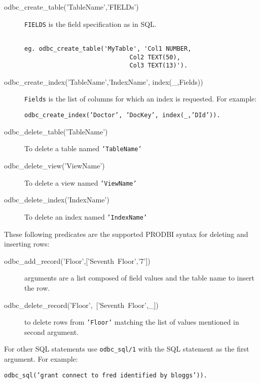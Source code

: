 \begin{description}

\item[odbc\_create\_table('TableName','FIELDs')]
	{\tt FIELDS} is the field specification as in SQL.
\begin{verbatim}

eg. odbc_create_table('MyTable', 'Col1 NUMBER,
                             Col2 TEXT(50),
                             Col3 TEXT(13)').
\end{verbatim}


\item[odbc\_create\_index('TableName','IndexName', index(\_,Fields))]
	{\tt Fields} is the list of columns for which an index
	is requested.  For example:
\begin{center}

{\tt odbc\_create\_index('Doctor', 'DocKey', index(\_,'DId')).}
\end{center}

\item[odbc\_delete\_table('TableName')] To delete a table named {\tt 'TableName'}

\item[odbc\_delete\_view('ViewName')] To delete a view named {\tt 'ViewName'}

\item[odbc\_delete\_index('IndexName')] To delete an index named {\tt 'IndexName'}
\end{description}

These following predicates are the supported PRODBI syntax for deleting and 
inserting rows:
\begin{description}

\item[\mbox{odbc\_add\_record('Floor',['Seventh Floor','7'])}]
	 arguments are a list composed of field values and the table name to
	 insert the row.

\item[\mbox{odbc\_delete\_record('Floor', ['Seventh Floor',\_])}]
	 to delete rows from {\tt 'Floor'} matching the list of values mentioned in
	 second argument. 
\end{description}

For other SQL statements use {\tt odbc\_sql/1} with the SQL statement as the 
     first argument.  For example:
\begin{center}
{\tt odbc\_sql('grant connect to fred identified by bloggs')).}
\end{center}

